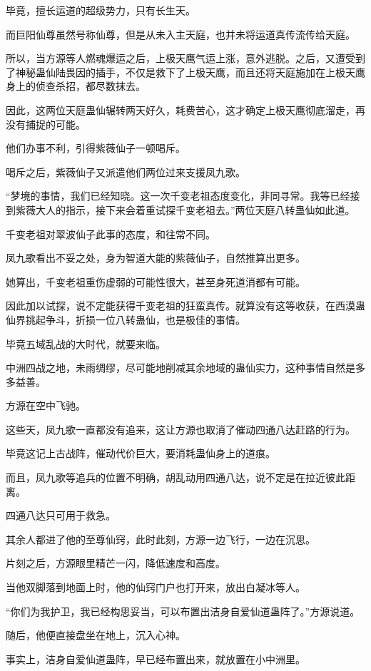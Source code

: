 \begin{this_body}
毕竟，擅长运道的超级势力，只有长生天。

而巨阳仙尊虽然号称仙尊，但是从未入主天庭，也并未将运道真传流传给天庭。

所以，当方源等人燃魂爆运之后，上极天鹰气运上涨，意外逃脱。之后，又遭受到了神秘蛊仙陆畏因的插手，不仅是救下了上极天鹰，而且还将天庭施加在上极天鹰身上的侦查杀招，都尽数抹去。

因此，这两位天庭蛊仙辗转两天好久，耗费苦心，这才确定上极天鹰彻底溜走，再没有捕捉的可能。

他们办事不利，引得紫薇仙子一顿喝斥。

喝斥之后，紫薇仙子又派遣他们两位过来支援凤九歌。

“梦境的事情，我们已经知晓。这一次千变老祖态度变化，非同寻常。我等已经接到紫薇大人的指示，接下来会着重试探千变老祖去。”两位天庭八转蛊仙如此道。

千变老祖对翠波仙子此事的态度，和往常不同。

凤九歌看出不妥之处，身为智道大能的紫薇仙子，自然推算出更多。

她算出，千变老祖重伤虚弱的可能性很大，甚至身死道消都有可能。

因此加以试探，说不定能获得千变老祖的狂蛮真传。就算没有这等收获，在西漠蛊仙界挑起争斗，折损一位八转蛊仙，也是极佳的事情。

毕竟五域乱战的大时代，就要来临。

中洲四战之地，未雨绸缪，尽可能地削减其余地域的蛊仙实力，这种事情自然是多多益善。

方源在空中飞驰。

这些天，凤九歌一直都没有追来，这让方源也取消了催动四通八达赶路的行为。

毕竟这记上古战阵，催动代价巨大，要消耗蛊仙身上的道痕。

而且，凤九歌等追兵的位置不明确，胡乱动用四通八达，说不定是在拉近彼此距离。

四通八达只可用于救急。

其余人都进了他的至尊仙窍，此时此刻，方源一边飞行，一边在沉思。

片刻之后，方源眼里精芒一闪，降低速度和高度。

当他双脚落到地面上时，他的仙窍门户也打开来，放出白凝冰等人。

“你们为我护卫，我已经构思妥当，可以布置出洁身自爱仙道蛊阵了。”方源说道。

随后，他便直接盘坐在地上，沉入心神。

事实上，洁身自爱仙道蛊阵，早已经布置出来，就放置在小中洲里。


\end{this_body}
